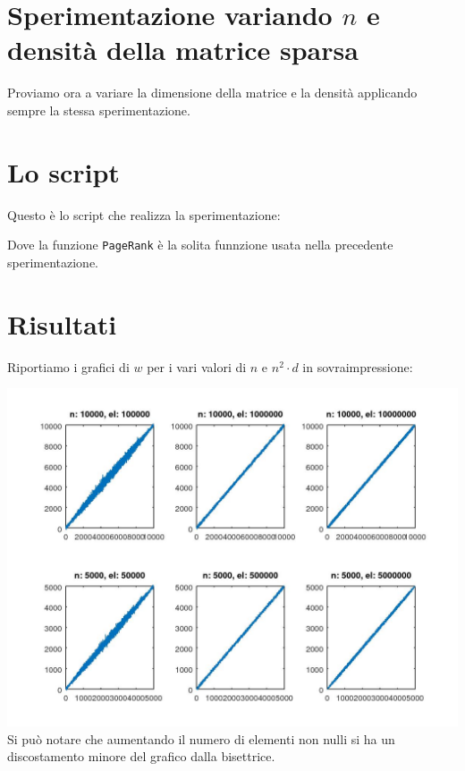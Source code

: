 \documentclass{article}
\begin{document}
	\section{Sperimentazione variando $n$ e densità della matrice sparsa}
	Proviamo ora a variare la dimensione della matrice e la densità applicando sempre la stessa sperimentazione.
	\section{Lo script}
	Questo è lo script che realizza la sperimentazione:
	
	Dove la funzione {\tt PageRank} è la solita funnzione usata nella precedente sperimentazione.
	\section{Risultati}
	Riportiamo i grafici di $w$ per i vari valori di $n$ e $n^2 \cdot d$ in sovraimpressione:
	
	\includegraphics[width=\textwidth]{grafico_es4o.jpeg}
	Si può notare che aumentando il numero di elementi non nulli si ha un discostamento minore del grafico dalla bisettrice.
\end{document}

